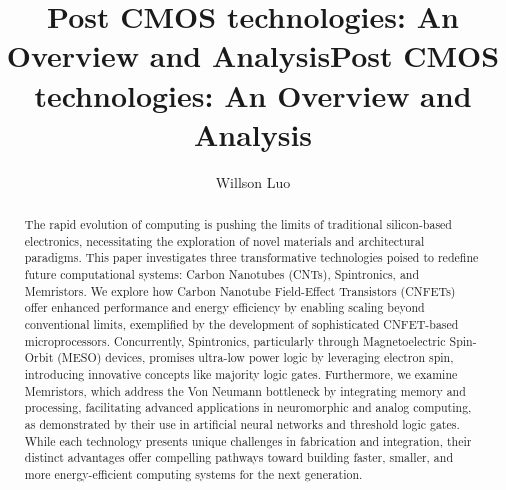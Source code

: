 \documentclass[sigconf]{acmart}
\title{Post CMOS technologies: An Overview and Analysis}
\begin{document}
\title{Post CMOS technologies: An Overview and Analysis}

\author{Willson Luo}

\begin{abstract}
  The rapid evolution of computing is pushing the limits of traditional 
  silicon-based electronics, necessitating the exploration of 
  novel materials and architectural paradigms. This paper 
  investigates three transformative technologies poised to 
  redefine future computational systems: Carbon Nanotubes 
  (CNTs), Spintronics, and Memristors. We explore how Carbon 
  Nanotube Field-Effect Transistors (CNFETs) offer enhanced 
  performance and energy efficiency by enabling scaling beyond 
  conventional limits, exemplified by the development of 
  sophisticated CNFET-based microprocessors. Concurrently, 
  Spintronics, particularly through Magnetoelectric Spin-Orbit 
  (MESO) devices, promises ultra-low power logic by leveraging 
  electron spin, introducing innovative concepts like majority 
  logic gates. Furthermore, we examine Memristors, which address 
  the Von Neumann bottleneck by integrating memory and processing, 
  facilitating advanced applications in neuromorphic and analog 
  computing, as demonstrated by their use in artificial neural 
  networks and threshold logic gates. While each technology 
  presents unique challenges in fabrication and integration, 
  their distinct advantages offer compelling pathways toward 
  building faster, smaller, and more energy-efficient computing 
  systems for the next generation.
\end{abstract}
\end{document}
